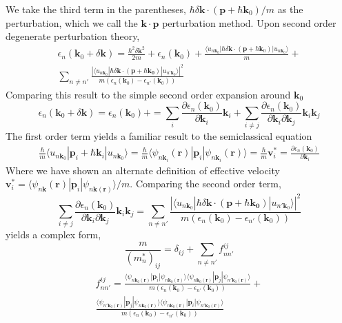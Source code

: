 \documentclass{article}
\begin{document}
We take the third term in the parentheses, $\hbar\delta\mathbf{k}\cdot(\mathbf{p}+\hbar\mathbf{k}_0)/m$ as the perturbation, which we call the $\mathbf{k}\cdot\mathbf{p}$ perturbation method. Upon second order degenerate perturbation theory,
\begin{multline}
	\epsilon_{n}(\mathbf{k}_0+\delta\mathbf{k})=\frac{\hbar^2\delta\mathbf{k}^2}{2m}+\epsilon_{n}(\mathbf{k}_0)+\frac{\langle u_{n\mathbf{k}_0}|\hbar\delta\mathbf{k}\cdot(\mathbf{p}+\hbar\mathbf{k}_0)|u_{n\mathbf{k}_0}\rangle}{m}+\\
	\sum_{n\neq n'}\frac{|\langle u_{n\mathbf{k}_0}|\hbar\delta\mathbf{k}\cdot(\mathbf{p+\hbar\mathbf{k_0}})|u_{n'\mathbf{k}_0}\rangle|^2}{m(\epsilon_{n}(\mathbf{k}_0)-\epsilon_{n'}(\mathbf{k}_0))}
\end{multline}
Comparing this result to the simple second order expansion around $\mathbf{k}_0$
$$\epsilon_n(\mathbf{k}_0+\delta\mathbf{k})=\epsilon_n(\mathbf{k}_0)+=\sum_i\frac{\partial\epsilon_n(\mathbf{k}_0)}{\partial\mathbf{k}_i}\mathbf{k}_i+\sum_{i\neq j}\frac{\partial\epsilon_n(\mathbf{k}_0)}{\partial\mathbf{k}_i\partial\mathbf{k}_j}\mathbf{k}_i\mathbf{k}_j$$
The first order term yields a familiar result to the semiclassical equation
\begin{multline*}
	\frac{\hbar}{m}\langle u_{n\mathbf{k}_0}|\mathbf{p}_i+\hbar\mathbf{k}_i|u_{n\mathbf{k}_0}\rangle=\frac{\hbar}{m}\langle\psi_{n\mathbf{k}_i}(\mathbf{r})|\mathbf{p}_i|\psi_{n\mathbf{k}_i}(\mathbf{r})\rangle=
	\frac{\hbar}{m}\mathbf{v}_{i}^{*}=\frac{\partial\epsilon_n(\mathbf{k}_0)}{\partial\mathbf{k}_i}
\end{multline*}
Where we have shown an alternate definition of effective velocity\\
$\mathbf{v}_{i}^*=\langle\psi_{n\mathbf{k}}(\mathbf{r})|\mathbf{p}_i|\psi_{n\mathbf{k}(\mathbf{r})}\rangle/m$.
Comparing the second order term,
$$\sum_{i\neq j}\frac{\partial\epsilon_n(\mathbf{k}_0)}{\partial\mathbf{k}_i\partial\mathbf{k}_j}\mathbf{k}_i\mathbf{k}_j=\sum_{n\neq n'}\frac{|\langle u_{n\mathbf{k}_0}|\hbar\delta\mathbf{k}\cdot(\mathbf{p+\hbar\mathbf{k_0}})|u_{n'\mathbf{k}_0}\rangle|^2}{m(\epsilon_{n}(\mathbf{k}_0)-\epsilon_{n'}(\mathbf{k}_0))}$$
yields a complex form,
$$\frac{m}{(m^*_{n})_{ij}}=\delta_{ij}+\sum_{n\neq n'}f_{nn'}^{ij}$$
\begin{multline*}
	f_{nn'}^{ij}=\frac{\langle\psi_{n\mathbf{k}_0(\mathbf{r})}|\mathbf{p}_i|\psi_{n\mathbf{k}_0(\mathbf{r})}\rangle\langle\psi_{n\mathbf{k}_0(\mathbf{r})}|\mathbf{p}_j|\psi_{n'\mathbf{k}_0(\mathbf{r})}\rangle}{m(\epsilon_n(\mathbf{k}_0)-\epsilon_{n'}(\mathbf{k}_0))}+\\
	\frac{\langle\psi_{n'\mathbf{k}_0(\mathbf{r})}|\mathbf{p}_j|\psi_{n\mathbf{k}_0(\mathbf{r})}\rangle\langle\psi_{n\mathbf{k}_0(\mathbf{r})}|\mathbf{p}_i|\psi_{n'\mathbf{k}_0(\mathbf{r})}\rangle}{m(\epsilon_n(\mathbf{k}_0)-\epsilon_{n'}(\mathbf{k}_0))}
\end{multline*}
\end{document}
